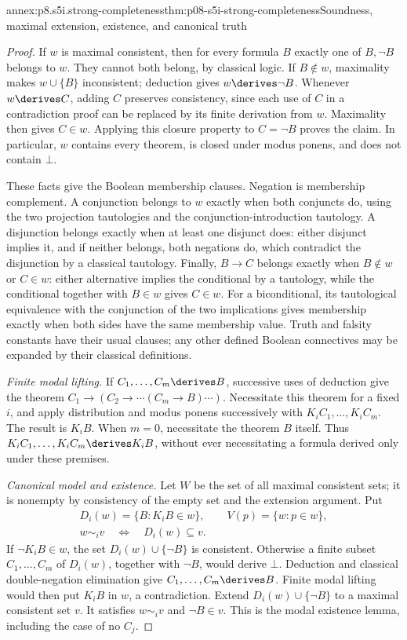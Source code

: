\begin{annexitem}{annex:p8.s5i.strong-completeness}{thm:p08-s5i-strong-completeness}{Soundness, maximal extension, existence, and canonical truth}
\begin{proof}
If \(w\) is maximal consistent, then for every formula \(B\) exactly
one of \(B,\neg B\) belongs to \(w\). They cannot both belong, by
classical logic. If \(B\notin w\), maximality makes
\(w\cup\{B\}\) inconsistent; deduction gives \(w\derives\neg B\).
Whenever \(w\derives C\), adding \(C\) preserves consistency, since
each use of \(C\) in a contradiction proof can be replaced by its finite
derivation from \(w\). Maximality then gives \(C\in w\). Applying
this closure property to \(C=\neg B\) proves the claim. In particular,
\(w\) contains every theorem, is closed under modus ponens, and does not
contain \(\bot\).

These facts give the Boolean membership clauses. Negation is membership
complement. A conjunction belongs to \(w\) exactly when both conjuncts
do, using the two projection tautologies and the conjunction-introduction
tautology. A disjunction belongs exactly when at least one disjunct does:
either disjunct implies it, and if neither belongs, both negations do,
which contradict the disjunction by a classical tautology. Finally,
\(B\to C\) belongs exactly when \(B\notin w\) or \(C\in w\):
either alternative implies the conditional by a tautology, while the
conditional together with \(B\in w\) gives \(C\in w\).
For a biconditional, its tautological equivalence with the conjunction of
the two implications gives membership exactly when both sides have the
same membership value. Truth and falsity constants have their usual
clauses; any other defined Boolean connectives may be expanded by their
classical definitions.

\emph{Finite modal lifting.} If \(C_1,\ldots,C_m\derives B\),
successive uses of deduction give the theorem
\(C_1\to(C_2\to\cdots(C_m\to B)\cdots)\).
Necessitate this theorem for a fixed \(i\), and apply distribution and
modus ponens successively with \(K_iC_1,\ldots,K_iC_m\). The result is
\(K_iB\). When \(m=0\), necessitate the theorem \(B\) itself. Thus
\(K_iC_1,\ldots,K_iC_m\derives K_iB\), without ever necessitating
a formula derived only under these premises.

\emph{Canonical model and existence.} Let \(W\) be the set of all
maximal consistent sets; it is nonempty by consistency of the empty set
and the extension argument. Put
\[
 \begin{gathered}
 D_i(w)=\{B:K_iB\in w\},\qquad V(p)=\{w:p\in w\},\\
 w\sim_i v\quad\Longleftrightarrow\quad D_i(w)\subseteq v.
 \end{gathered}
\]
If \(\neg K_iB\in w\), the set \(D_i(w)\cup\{\neg B\}\)
is consistent. Otherwise a finite subset
\(C_1,\ldots,C_m\) of \(D_i(w)\), together with \(\neg B\),
would derive \(\bot\). Deduction and classical double-negation
elimination give \(C_1,\ldots,C_m\derives B\). Finite modal lifting
would then put \(K_iB\) in \(w\), a contradiction. Extend
\(D_i(w)\cup\{\neg B\}\) to a maximal consistent set \(v\).
It satisfies \(w\sim_i v\) and \(\neg B\in v\). This is the
modal existence lemma, including the case of no \(C_j\).


\end{proof}
\end{annexitem}
